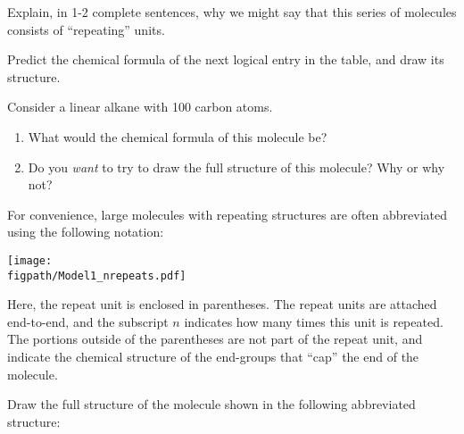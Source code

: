 \begin{activity}
\begin{ctqs}
	\question Explain, in 1-2 complete sentences, why we might say that this series of molecules consists of ``repeating''  units.
			
				\begin{solution}[2in]
				\end{solution}
				
		
	\question Predict the chemical formula of the next logical entry in the table, and draw its structure.
			
				\begin{solution}[1in]
				\end{solution}
		
	\question Consider a linear alkane with 100 carbon atoms. \label{\labelbase:ctq:100Calkane}
		\begin{enumerate}
			
			\item What would the chemical formula of this molecule be?
			
				\begin{solution}[1in]
				\end{solution}
			
			\item Do you \emph{want} to try to draw the full structure of this molecule?  Why or why not?
			
				\begin{solution}[1.5in]
				\end{solution}
		\end{enumerate}
\end{ctqs}

\begin{infobox}
	For convenience, large molecules with repeating structures are often abbreviated using the following notation:
	
	\centerline{\texttt{[image: \\figpath/Model1\_nrepeats.pdf]}}
	
	Here, the repeat unit is enclosed in parentheses.  The repeat units are attached end-to-end, and the subscript $n$ indicates how many times this unit is repeated.  The portions outside of the parentheses are not part of the repeat unit, and indicate the chemical structure of the end-groups that ``cap'' the end of the molecule.
\end{infobox}

\begin{ctqs}
	\question Draw the full structure of the molecule shown in the following abbreviated structure: \label{\labelbase:ctq:abbrevbutane}
	

\end{ctqs}
\end{activity}
